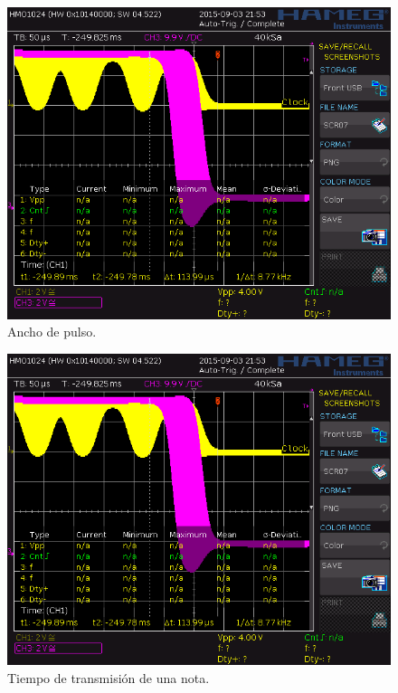 \begin{figure}[H]
	\noindent \begin{centering}
		\includegraphics[width=\linewidth*2/3]{capitulo6/osc_pulso}
		\par\end{centering}
	\smallskip
	\caption{\label{fig:osc_pulso} Ancho de pulso.}
\end{figure} 

\smallskip

\smallskip

\begin{figure}[H]
	\noindent \begin{centering}
		\includegraphics[width=\linewidth*2/3]{capitulo6/osc_nota}
		\par\end{centering}
	\smallskip
	\caption{\label{fig:osc_nota} Tiempo de transmisión de una nota.}
\end{figure} 

